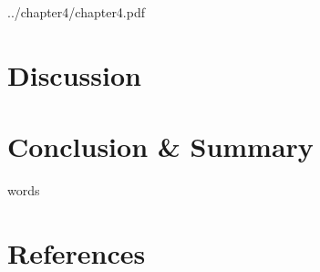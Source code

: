 \documentclass[fleqn,12pt]{SelfArx} %
\newcounter{secnonum}
\begin{document}
{}

            {../chapter4/chapter4.pdf}



\section{Discussion}


\section{Conclusion \& Summary}
words

\section{References}



\end{document}
